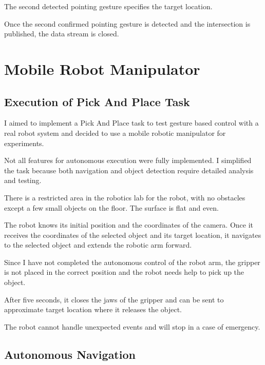 The second detected pointing gesture specifies the target location.\par
Once the second confirmed pointing gesture is detected and the intersection is published, the data stream is closed.\par


\section{Mobile Robot Manipulator}

\subsection{Execution of Pick And Place Task}
I aimed to implement a Pick And Place task to test gesture based control with a real robot system and decided to use a mobile robotic manipulator for experiments.\par
Not all features for autonomous execution were fully implemented. I simplified the task because both navigation and object detection require detailed analysis and testing.\par
There is a restricted area in the robotics lab for the robot, with no obstacles except a few small objects on the floor. The surface is flat and even.\par
The robot knows its initial position and the coordinates of the camera. Once it receives the coordinates of the selected object and its target location, it navigates to the selected object and extends the robotic arm forward.\par
Since I have not completed the autonomous control of the robot arm, the gripper is not placed in the correct position and the robot needs help to pick up the object.\par
After five seconds, it closes the jaws of the gripper and can be sent to approximate target location where it releases the object.\par
The robot cannot handle unexpected events and will stop in a case of emergency.\par

\subsection{Autonomous Navigation}

